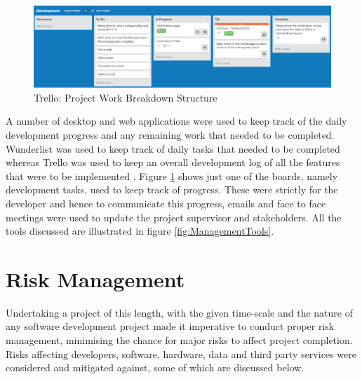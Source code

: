 \begin{figure}[H]
    \centering
    \includegraphics[width=1.0\textwidth]{Images/ProjectManagement/Trello}
    \caption{Trello: Project Work Breakdown Structure} \label{fig:Trello_WBS}
\end{figure}

A number of desktop and web applications were used to keep track of the daily development progress and any remaining work that needed to be completed. Wunderlist was used to keep track of daily tasks that needed to be completed whereas Trello was used to keep an overall development log of all the features that were to be implemented \cite{Wunderlist:Home, Trello:Home}. Figure \ref{fig:Trello_WBS} shows just one of the boards, namely development tasks, used to keep track of progress. These were strictly for the developer and hence to communicate this progress, emails and face to face meetings were used to update the project supervisor and stakeholders. All the tools discussed are illustrated in figure \ref{fig:ManagementTools}.

\section{Risk Management}
Undertaking a project of this length, with the given time-scale and the nature of any software development project made it imperative to conduct proper risk management, minimising the chance for major risks to affect project completion. Risks affecting developers, software, hardware, data and third party services were considered and mitigated against, some of which are discussed below.

